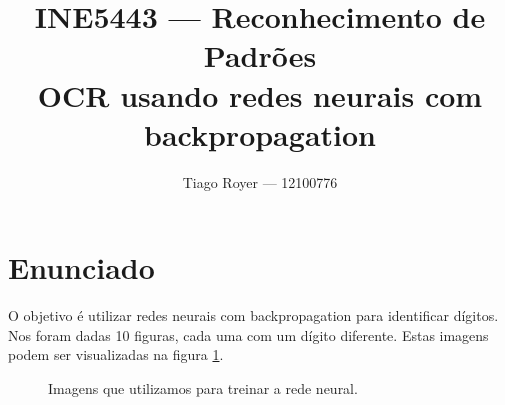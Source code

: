 \documentclass{article}
\begin{document}
\title{
    INE5443 --- Reconhecimento de Padrões\\
    OCR usando redes neurais com backpropagation
}
\author{
    Tiago Royer --- 12100776
}

\maketitle

\section{Enunciado}

O objetivo é utilizar redes neurais com backpropagation
para identificar dígitos.
Nos foram dadas 10 figuras, cada uma com um dígito diferente.
Estas imagens podem ser visualizadas na figura \ref{digitos}.

\begin{figure}[h]
    \centering


    \caption{Imagens que utilizamos para treinar a rede neural.}
    \label{digitos}
\end{figure}
\end{document}
